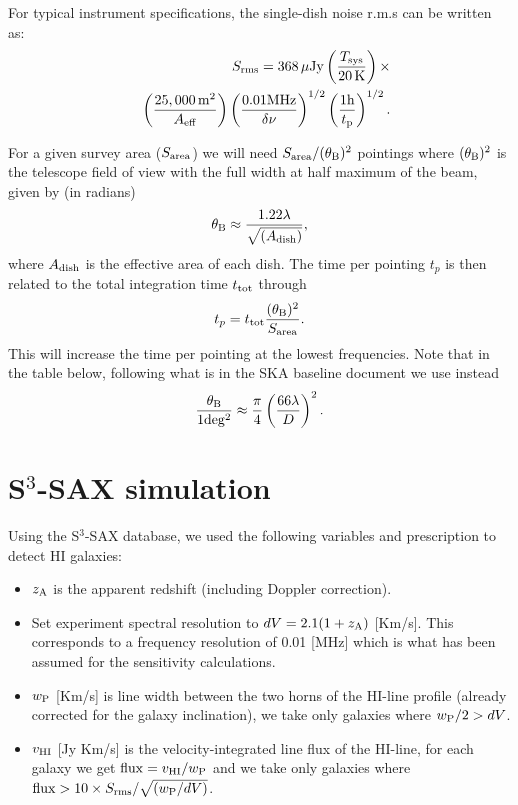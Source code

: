 \documentclass[useAMS,usenatbib]{mn2e}
\newcommand{\bea}{\begin{eqnarray}}
\newcommand{\eea}{\end{eqnarray}}
\begin{document}
For typical instrument specifications, the single-dish noise r.m.s can be written as:
\bea
\label{rms}
&&S_{\rm{rms}} = 368\, {\rm \mu Jy}\left(\frac{T_{\rm sys}}{20\, \rm K}\right)\times\nonumber\\
&& \left(\frac{25,000\, \rm m^2}{A_{\rm eff}}\right)\left(\frac{0.01 \rm MHz}{\delta\nu}\right)^{1/2}\left(\frac{1 \rm h}{t_{\rm p}}\right)^{1/2}. 
\eea

For a given survey area ($S_{\rm area}$) we will need $S_{\rm area}/(\theta_{\rm B})^2$ pointings where $(\theta_{\rm B})^2$ is the telescope field of view with the full width at half maximum of the beam, given by (in radians)
\begin{equation}
\theta_{\rm B} \approx \frac{1.22 \lambda}{\sqrt{(A_{\rm dish})}},
\end{equation}
where $A_{\rm dish}$ is the effective area of each dish.
The time per pointing $t_p$ is then related to the total integration time $t_{\rm tot}$ through
\begin{equation}
t_p=t_{\rm tot} \frac{(\theta_{\rm B})^2}{S_{\rm area}}.
\end{equation}
This will increase the time per pointing at the lowest frequencies.
Note that in the table below, following what is in the SKA baseline document we use instead
\begin{equation}
\frac{\theta_{\rm B}}{1{\rm deg^2}} \approx \frac{\pi}{4}\left(\frac{66\lambda}{D}\right)^2.
\end{equation}


\section{S$^3$-SAX simulation}\label{sax3_simulation}
Using the S$^3$-SAX database, we used the following variables and prescription to detect HI galaxies:
\begin{itemize}
\item
$z_{\rm A}$ is  the apparent redshift (including Doppler correction).
\item
Set experiment spectral resolution to $dV = 2.1(1+z_{\rm A})$ [Km/s]. This corresponds to a frequency resolution of 0.01 [MHz] which is what has been assumed for the sensitivity calculations.
\item
$w_{\rm P}$ [Km/s]  is line width between the two horns of the HI-line profile (already corrected for the galaxy inclination), we take only galaxies where $w_{\rm P}/2 > dV$.
\item
$v_{\rm HI}$ [Jy Km/s] is the velocity-integrated line flux of the HI-line, for each galaxy we get ${\rm flux} =  v_{\rm HI} /w_{\rm P}$ and we take only galaxies where ${\rm flux}>10\times S_{\rm rms}/\sqrt{(w_{\rm P}/dV)}$.
\end{itemize}
\end{document}
